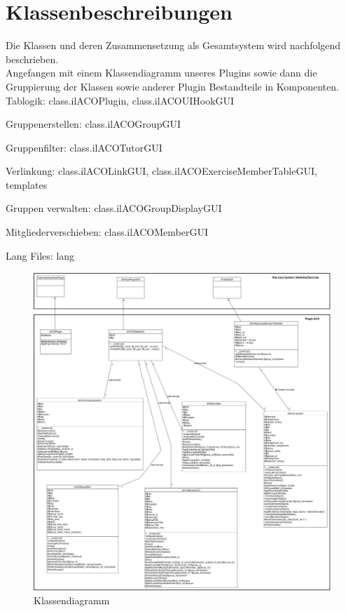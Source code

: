 \chapter{Klassenbeschreibungen}
\minitoc


Die Klassen und deren Zusammensetzung als Gesamtsystem wird
nachfolgend beschrieben. 
\\

Angefangen mit einem Klassendiagramm unseres Plugins sowie 
dann die Gruppierung der Klassen sowie anderer Plugin Bestandteile in
Komponenten.		
\\

Tablogik: class.ilACOPlugin, class.ilACOUIHookGUI 

Gruppenerstellen: class.ilACOGroupGUI

Gruppenfilter: class.ilACOTutorGUI

Verlinkung: class.ilACOLinkGUI, class.ilACOExerciseMemberTableGUI, templates

Gruppen verwalten: class.ilACOGroupDisplayGUI

Mitgliederverschieben: class.ilACOMemberGUI

Lang Files: lang


\begin{figure}
	\centering
	\includegraphics[width=1\textwidth]{img/klassendiagramm.jpg}
	\caption{Klassendiagramm}
\end{figure}

